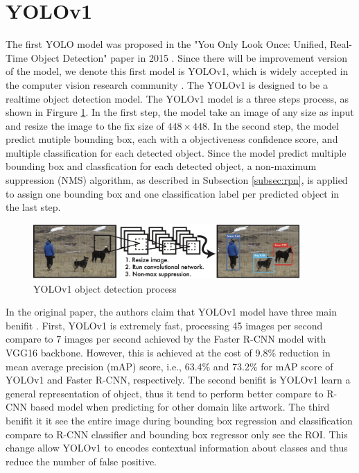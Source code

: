 \section{YOLOv1}  \label{sec:yolov1}

The first YOLO model was proposed in the "You Only Look Once: Uniﬁed, Real-Time Object Detection" paper in 2015 \cite{yolov1_2016}. Since there will be improvement version of the model, we denote this first model is YOLOv1, which is widely accepted in the computer vision research community \cite{understand_cnn_vs_yolo}. The YOLOv1 is designed to be a realtime object detection model. The YOLOv1 model is a three steps process, as shown in Firgure \ref{fig:yolov1_process}. In the first step, the model take an image of any size as input and resize the image to the fix size of $448 \times 448$. In the second step, the model predict mutiple bounding box, each with a objectiveness confidence score, and multiple classification for each detected object. Since the model predict multiple bounding box and classfication for each detected object, a non-maximum suppression (NMS) algorithm, as described in Subsection \ref{subsec:rpn}, is applied to assign one bounding box and one classification label per predicted object in the last step.

\begin{figure}[!ht]
    \centering
    \includegraphics[width=4in]{figures/yolov1_process.png}
    \caption{YOLOv1 object detection process \cite{yolov1_2016}} 
    \label{fig:yolov1_process}
\end{figure}

In the original paper, the authors claim that YOLOv1 model have three main benifit \cite{yolov1_2016}. First, YOLOv1 is extremely fast, processing 45 images per second compare to 7 images per second achieved by the Faster R-CNN model with VGG16 backbone. However, this is achieved at the cost of 9.8\% reduction in mean average precision (mAP) score, i.e., 63.4\% and 73.2\% for mAP score of YOLOv1 and Faster R-CNN, respectively. The second benifit is YOLOv1 learn a general representation of object, thus it tend to perform better compare to R-CNN based model when predicting for other domain like artwork. The third benifit it it see the entire image during bounding box regression and classification compare to R-CNN classifier and bounding box regressor only see the ROI. This change allow YOLOv1 to encodes contextual information about classes and thus reduce the number of false positive.

